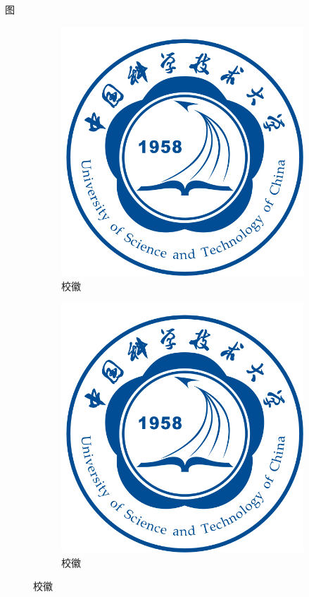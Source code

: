 \documentclass{beamer}%
\begin{document}
	\begin{frame}{图}
		\begin{figure}[htb]
			\label{fig:example}
			\begin{subfigure}{.45\textwidth}
				\centering
				\includegraphics[width=\textwidth]{ustc-logo.jpg}
				\caption{校徽}
				\label{fig:logoa}
			\end{subfigure}
			\begin{subfigure}{.45\textwidth}
				\centering
				\includegraphics[width=\textwidth]{ustc-logo.jpg}
				\caption{校徽}
				\label{fig:logob}
			\end{subfigure}
			\caption{校徽}
		\end{figure}
	\end{frame}
	
\end{document}
